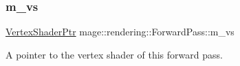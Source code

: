 \subsubsection{\texorpdfstring{m\+\_\+vs}{m\_vs}}
{\footnotesize\ttfamily \mbox{\hyperlink{namespacemage_1_1rendering_aaf704b9c54a4181f4950a1761de69dda}{Vertex\+Shader\+Ptr}} mage\+::rendering\+::\+Forward\+Pass\+::m\+\_\+vs\hspace{0.3cm}{\ttfamily [private]}}

A pointer to the vertex shader of this forward pass. 